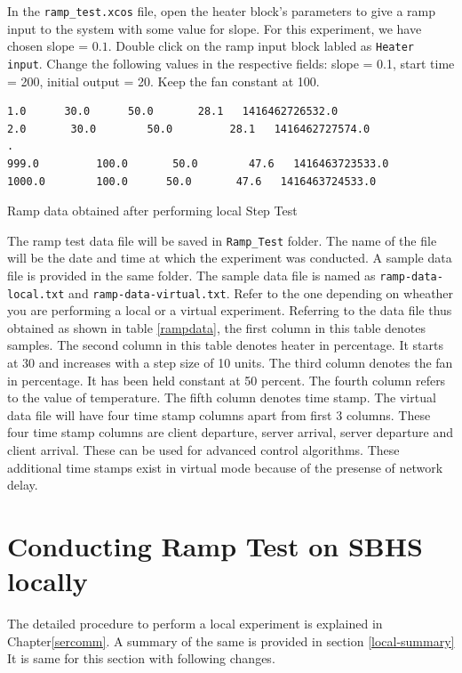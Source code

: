  In the {\tt ramp\_test.xcos} file, open the heater block's parameters to give a ramp input to the system with some value for slope. For this experiment, we have chosen slope = $0.1$. Double click on the ramp input block labled as {\tt Heater input}. Change the following values in the respective fields: slope = 0.1, start time = 200, initial output = 20. Keep the fan constant at 100.


\begin{table}
\begin{verbatim}
1.0      30.0      50.0       28.1   1416462726532.0
2.0       30.0        50.0         28.1   1416462727574.0
.
999.0         100.0       50.0        47.6   1416463723533.0
1000.0        100.0      50.0       47.6   1416463724533.0
\end{verbatim}
\caption{Ramp data obtained after performing local Step Test}
\label{rampdata}
\end{table}

The ramp test data file will be saved in {\tt Ramp\_Test} folder. The name of the file will be the date and time at which the experiment was conducted. A sample data file is provided in the same folder. The sample data file is named as {\tt ramp-data-local.txt} and {\tt ramp-data-virtual.txt}. Refer to the one depending on wheather you are performing a local or a virtual experiment. Referring to the data file thus obtained as shown in table \ref{rampdata}, the first column in this table denotes samples. The second column in this table denotes heater in percentage. It starts at 30 and increases with a step size of 10 units. The third column denotes the fan in percentage. It has been held constant at 50 percent. The fourth column refers to the value of temperature. The fifth column denotes time stamp. The virtual data file will have four time stamp columns apart from first 3 columns. These four time stamp columns are client departure, server arrival, server departure and client arrival. These can be used for advanced control algorithms. These additional time stamps exist in virtual mode because of the presense of network delay.

\section{Conducting Ramp Test on SBHS locally}
The detailed procedure to perform a local experiment is explained in Chapter\ref{sercomm}. A summary of the same is provided in section \ref{local-summary} It is same for this section with following changes.

